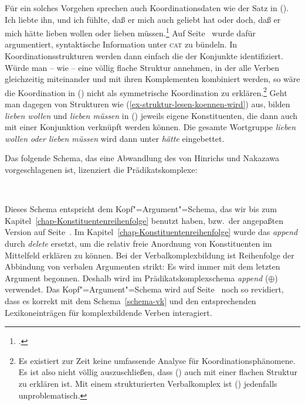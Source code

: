 Für ein solches Vorgehen sprechen auch Koordinationsdaten
wie der Satz in ().
\ea
Ich liebte ihn, und ich fühlte, daß er mich auch geliebt hat oder doch, daß er mich
hätte lieben wollen oder lieben müssen.\footnote{
        .
}
\z
Auf Seite~\pageref{page-symmetrische-koordination} wurde dafür argumentiert,
syntaktische Information unter \textsc{cat} zu bündeln. In Koordinationsstrukturen werden
dann einfach die \catwe der Konjunkte identifiziert. Würde man -- wie \zb \citet*{BvN96,BvN98a} --
eine völlig flache Struktur annehmen, in der alle Verben
gleichzeitig miteinander und mit ihren Komplementen kombiniert werden,
so wäre die Koordination in () nicht als symmetrische Koordination zu erklären.\footnote{
        Es existiert zur Zeit keine umfassende Analyse für Koordinationsphänomene. Es ist also
        nicht völlig auszuschließen, dass () auch mit einer flachen Struktur zu erklären ist.
        Mit einem strukturierten Verbalkomplex ist () jedenfalls unproblematisch.%
}
Geht man dagegen von Strukturen wie (\ref{ex-struktur-lesen-koennen-wird}) aus, bilden \emph{lieben wollen}
und \emph{lieben müssen} in () jeweils eigene Konstituenten, die dann auch mit einer Konjunktion
verknüpft werden können. Die gesamte Wortgruppe \emph{lieben wollen oder lieben müssen} wird dann unter
\emph{hätte} eingebettet.


Das folgende Schema, das eine Abwandlung des von
Hinrichs und Nakazawa vorgeschlagenen ist, lizenziert die Prädikatskomplexe:
\begin{samepage}
\begin{schema}[Prädikatskomplexschema]
\label{schema-vk}
 \impl\\
\end{schema}
\end{samepage}
%
Dieses Schema entspricht dem Kopf"=Argument"=Schema, das wir bis zum Kapitel~\ref{chap-Konstituentenreihenfolge}
benutzt haben, bzw.\ der angepaßten Version auf Seite~\pageref{schema-head-arg}.
Im Kapitel~\ref{chap-Konstituentenreihenfolge} wurde das \emph{append} durch \emph{delete}
ersetzt, um die relativ freie Anordnung von Konstituenten im Mittelfeld erklären zu können.
Bei der Verbalkomplexbildung ist Reihenfolge der Abbindung von verbalen Argumenten strikt: Es wird
immer mit dem letzten Argument begonnen. Deshalb wird im Prädikatskomplexschema \emph{append} ($\oplus$)
verwendet. Das Kopf"=Argument"=Schema wird auf Seite~\pageref{schema-bin} noch so revidiert,
dass es korrekt mit dem Schema~\ref{schema-vk} und den entsprechenden Lexikoneinträgen für komplexbildende
Verben interagiert.


